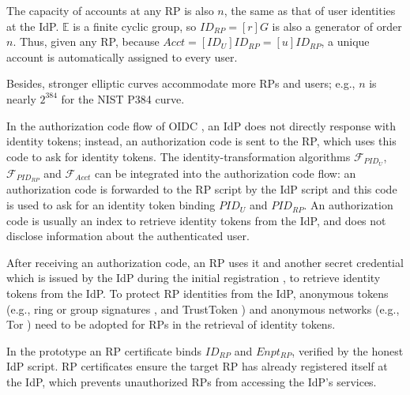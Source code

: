 The capacity of accounts at any RP is also $n$,
    the same as that of user identities at the IdP.
$\mathbb{E}$ is a finite cyclic group,
    so $ID_{RP} = [r]G$ is also a generator of order $n$.
Thus, given any RP,
because $Acct =  [ID_U]ID_{RP} = [u]ID_{RP}$,
    a unique account is automatically assigned to every user.

Besides, stronger elliptic curves accommodate more RPs and users;
e.g., $n$ is nearly $2^{384}$ for the NIST P384 curve.


\vspace{0.75mm}
In the authorization code flow of OIDC \cite{OpenIDConnect},
    an IdP does not directly response with identity tokens;
        instead,
            an authorization code is sent to the RP,
            which uses this code to ask for identity tokens.
The identity-transformation algorithms $\mathcal{F}_{PID_{U}}$, $\mathcal{F}_{PID_{RP}}$ and $\mathcal{F}_{Acct}$
    can be integrated into the authorization code flow:
            an authorization code is forwarded to the RP script by the IdP script
                and this code is used to ask for an identity token binding $PID_U$ and $PID_{RP}$.
An authorization code is usually an index to retrieve identity tokens from the IdP,
        and does not disclose information about the authenticated user.


After receiving an authorization code, an RP uses it and another secret credential
         which is issued by the IdP during the initial registration \cite{OpenIDConnect},
     to retrieve identity tokens from the IdP.
To protect RP identities from the IdP,
        anonymous tokens (e.g., ring or group signatures \cite{ring-sig,chaum1991group},
         and TrustToken \cite{trusttoken})
        and anonymous networks (e.g., Tor \cite{tor}) need to be adopted for RPs
         in the retrieval of identity tokens.

\vspace{0.75mm}
In the prototype an RP certificate binds $ID_{RP}$ and $Enpt_{RP}$,
    verified by the honest IdP script.
RP certificates ensure the target RP has already registered itself at the IdP,
 which prevents unauthorized RPs from accessing the IdP's services.

